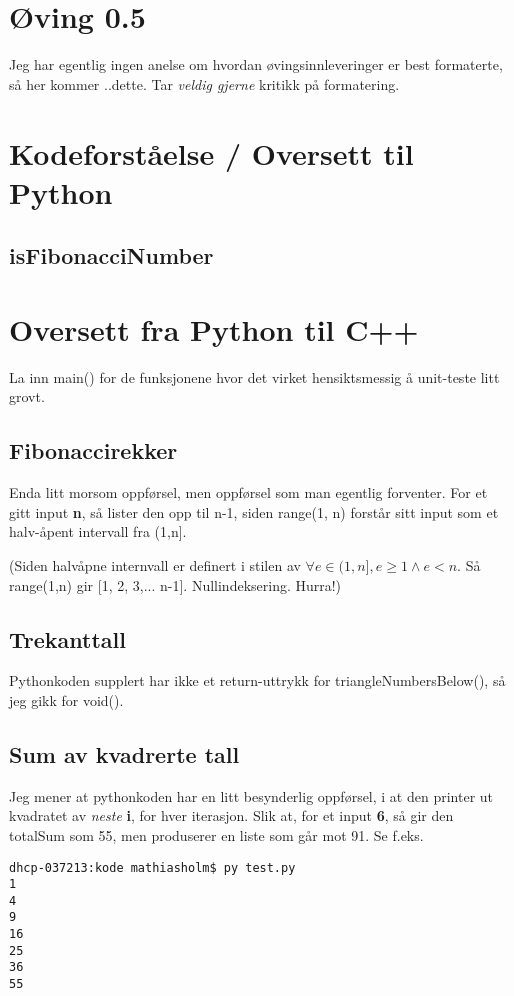 \documentclass{article}
\begin{document}
\section*{Øving 0.5}

Jeg har egentlig ingen anelse om hvordan øvingsinnleveringer er best formaterte, så her kommer ..dette. Tar \emph{veldig gjerne} kritikk på formatering.

\section{Kodeforståelse / Oversett til Python}
\subsection{isFibonacciNumber}


\newpage
\section{Oversett fra Python til C++}
La inn main() for de funksjonene hvor det virket hensiktsmessig å unit-teste litt grovt.

\subsection{Fibonaccirekker}


Enda litt morsom oppførsel, men oppførsel som man egentlig forventer.
For et gitt input {\bfseries n}, så lister den opp til n-1, siden range(1, n) forstår sitt input som et halv-åpent intervall fra (1,n].

(Siden halvåpne internvall er definert i stilen av $\forall e \in (1,n], e \geq 1 \land e < n $. Så range(1,n) gir [1, 2, 3,... n-1]. Nullindeksering. Hurra!)

\newpage
\subsection{Trekanttall}


Pythonkoden supplert har ikke et return-uttrykk for triangleNumbersBelow(), så jeg gikk for void().

\newpage
\subsection{Sum av kvadrerte tall}

Jeg mener at pythonkoden har en litt besynderlig oppførsel, i at den printer ut kvadratet av \emph{neste} {\bfseries i}, for hver iterasjon.
Slik at, for et input {\bfseries 6}, så gir den totalSum som 55, men produserer en liste som går mot 91.
Se f.eks.\\
\begin{verbatim}
dhcp-037213:kode mathiasholm$ py test.py 
1
4
9
16
25
36
55
\end{verbatim}
\end{document}
